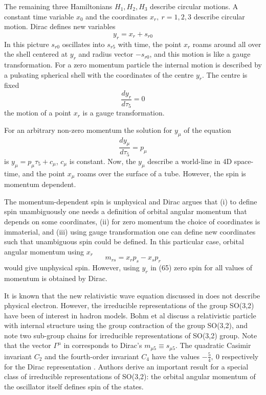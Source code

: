 \documentclass[aps, singlecolumn, showpacs]{revtex4-2}
\begin{document}
The remaining three Hamiltonians $ H_1, H_2, H_3$ describe circular motions. A constant time variable $x_0$ and the coordinates $x_r, ~r=1,2,3$ describe circular motion. Dirac defines new variables
\begin{equation}
y_r =x_r +s_{r0}
\end{equation}
In this picture $s_{r0}$ oscillates into $s_{r5}$ with time, the point $x_r$ roams around all over the shell centered at $y_r$ and radius vector $-s_{r0}$, and this motion is like a gauge transformation. For a zero momentum particle the internal motion is described by a pulsating spherical shell with the coordinates of the centre $y_r$. The centre is fixed
\begin{equation}
\frac{d y_r}{d \tau_5} =0
\end{equation}
the motion of a point $x_r$ is a gauge transformation.

For an arbitrary non-zero momentum the solution for $y_\mu$ of the equation
\begin{equation}
\frac{d y_\mu}{d \tau_5} =p_\mu
\end{equation}
is $y_\mu =p_\mu \tau_5 +c_\mu$, $c_\mu$ is constant. Now, the $y_\mu$ describe a world-line in 4D space-time, and the point $x_\mu$ roams over the surface of a tube. However, the spin is momentum dependent.

The momentum-dependent spin is unphysical and Dirac argues that (i) to define spin unambiguously one needs a definition of orbital angular momentum that depends on some coordinates, (ii) for zero momentum the choice of coordinates is immaterial, and (iii) using gauge transformation one can define new coordinates such that unambiguous spin could be defined. In this particular case, orbital angular momentum using $x_r$ 
\begin{equation}
m_{rs} = x_r p_s -  x_s p_r
\end{equation}
would give unphysical spin. However, using $y_r$ in (65) zero spin for all values of momentum is obtained by Dirac. 

It is known that the new relativistic wave equation discussed in \cite{30,31} does not describe physical electron. However, the irreducible representations of the group SO(3,2) have been of interest in hadron models. Bohm et al \cite{29} discuss a relativistic particle with internal structure using the group contraction of the group SO(3,2), and note two sub-group chains for irreducible representations of SO(3,2) group.
Note that the vector $\Gamma^\mu$ in \cite{29} corresponds to Dirac's $m_{\mu 5}\equiv s_{\mu 5}$. The quadratic Casimir invariant $C_2$ and the fourth-order invariant $C_4$ have the values $-\frac{5}{4}, ~0$ respectively for the Dirac representation \cite{15}.  Authors \cite{29} derive an important result for a special class of irreducible representations of SO(3,2): the orbital angular momentum of the oscillator itself defines spin of the states. 
\end{document}
